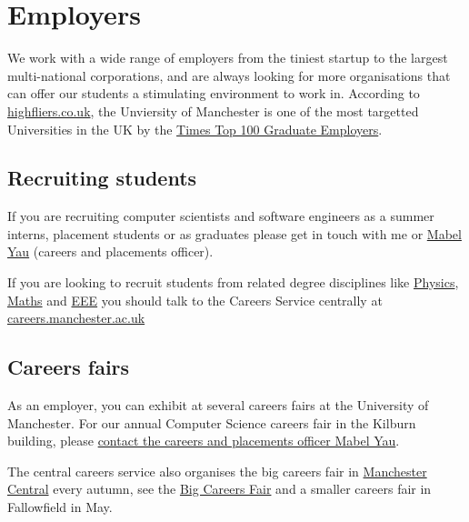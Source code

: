 \documentclass[12pt,]{book}
\begin{document}
\hypertarget{employers}{%
\chapter{Employers}\label{employers}}

We work with a wide range of employers from the tiniest startup to the largest multi-national corporations, and are always looking for more organisations that can offer our students a stimulating environment to work in. According to \href{https://www.highfliers.co.uk}{highfliers.co.uk}, the Unviersity of Manchester is one of the most targetted Universities in the UK by the \href{https://www.top100graduateemployers.com}{Times Top 100 Graduate Employers}.

\hypertarget{recruiting-students}{%
\section{Recruiting students}\label{recruiting-students}}

If you are recruiting computer scientists and software engineers as a summer interns, placement students or as graduates please get in touch with me or \href{https://uk.linkedin.com/in/mabel-yau}{Mabel Yau} (careers and placements officer).

If you are looking to recruit students from related degree disciplines like \href{https://www.physics.manchester.ac.uk/}{Physics}, \href{https://www.maths.manchester.ac.uk/}{Maths} and \href{https://www.eee.manchester.ac.uk/}{EEE} you should talk to the Careers Service centrally at \href{http://www.careers.manchester.ac.uk/}{careers.manchester.ac.uk}

\hypertarget{careers-fairs}{%
\section{Careers fairs}\label{careers-fairs}}

As an employer, you can exhibit at several careers fairs at the University of Manchester. For our annual Computer Science careers fair in the Kilburn building, please \protect\hyperlink{contact}{contact the careers and placements officer Mabel Yau}.

The central careers service also organises the big careers fair in \href{https://www.manchestercentral.co.uk/}{Manchester Central} every autumn, see
the \href{http://www.careers.manchester.ac.uk/events/bigcareersfair/}{Big Careers Fair} and a smaller careers fair in Fallowfield in May.
\end{document}

